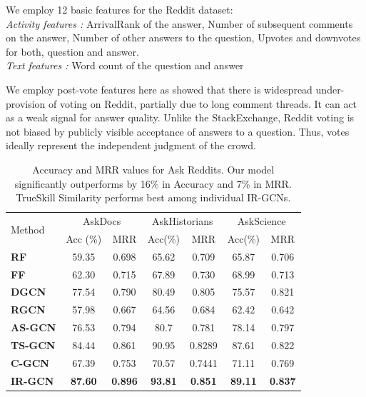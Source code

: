 \documentclass[smallcondensed]{svjour3}     %
\begin{document}
We employ 12 basic features for the Reddit dataset: \\
\emph{Activity features :} ArrivalRank of the answer, Number of subsequent comments on the answer, Number of other answers to the question, Upvotes and downvotes for both, question and answer.\\
\emph{Text features :} Word count of the question and answer

We employ post-vote features here as \cite{Gilbert:2013} showed that there is widespread under-provision of voting on Reddit, partially due to long comment threads. It can act as a weak signal for answer quality. Unlike the StackExchange, Reddit voting is not biased by publicly visible acceptance of answers to a question. Thus, votes ideally represent the independent judgment of the crowd.
\begin{table}[h]
\centering
 \begin{tabular}{l|c c| c c|c c}
   \toprule
   \multirow{2}{*}{Method} &
     \multicolumn{2}{c}{AskDocs} &
     \multicolumn{2}{c}{AskHistorians} &
     \multicolumn{2}{c}{AskScience} \\
     & {Acc (\%)} & {MRR} & {Acc(\%)} & {MRR} & {Acc(\%)} & {MRR} \\
     \midrule
   \textbf{RF} & 59.35 & 0.698 & 65.62 & 0.709 & 65.87 & 0.706  \\
   \textbf{FF} & 62.30 & 0.715 & 67.89 & 0.730 & 68.99 & 0.713 \\
   \textbf{DGCN} & 77.54 & 0.790 & 80.49 & 0.805 & 75.57 & 0.821 \\
   \textbf{RGCN} & 57.98 & 0.667 & 64.56 & 0.684 & 62.42 & 0.642 \\
   \midrule
   \textbf{AS-GCN} & 76.53 & 0.794 & 80.7 & 0.781 & 78.14 & 0.797 \\
   \textbf{TS-GCN} & 84.44 & 0.861 & 90.95 & 0.8289 & 87.61 & 0.822 \\
   \textbf{C-GCN} & 67.39 & 0.753 & 70.57 & 0.7441 & 71.11 & 0.769 \\
   \textbf{IR-GCN} & \bfseries 87.60 & \bfseries 0.896 & \bfseries 93.81 & \bfseries 0.851 & \bfseries 89.11 & \bfseries 0.837 \\
   \bottomrule
 \end{tabular}
 \caption{\label{tab:reddit} Accuracy and MRR values for Ask\* Reddits. Our model significantly outperforms by 16\% in Accuracy and 7\% in MRR. TrueSkill Similarity performs best among individual IR-GCNs.}
\end{table}
\end{document}
